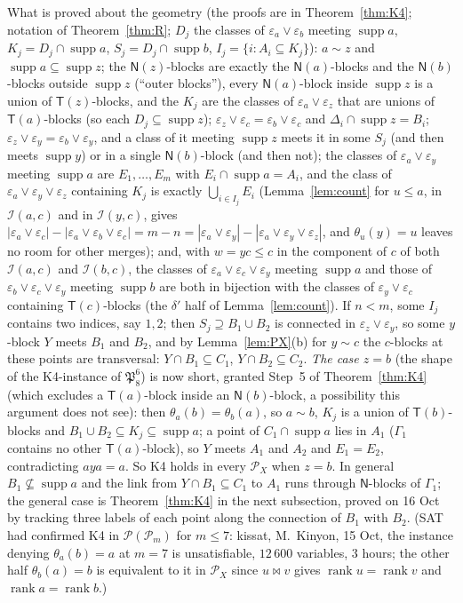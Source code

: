 \documentclass[11pt]{amsart}
\theoremstyle{definition}
\renewcommand{\P}{\mathcal{P}}
\newcommand{\supp}{\operatorname{supp}}
\newcommand{\T}{\mathsf{T}}
\newcommand{\N}{\mathsf{N}}
\newcommand{\rk}{\operatorname{rank}}
\newcommand{\mt}{\bowtie}   %
\begin{document}
What is proved about the geometry (the proofs are in Theorem~\ref{thm:K4}; notation of Theorem~\ref{thm:R}; $D_j$ the classes of $\varepsilon_a\vee\varepsilon_b$ meeting $\supp a$, $K_j=D_j\cap\supp a$, $S_j=D_j\cap\supp b$, $I_j=\{i:A_i\subseteq K_j\}$): $a\sim z$ and $\supp a\subseteq\supp z$; the $\N(z)$-blocks are exactly the $\N(a)$-blocks and the $\N(b)$-blocks outside $\supp z$ (``outer blocks''), every $\N(a)$-block inside $\supp z$ is a union of $\T(z)$-blocks, and the $K_j$ are the classes of $\varepsilon_a\vee\varepsilon_z$ that are unions of $\T(a)$-blocks (so each $D_j\subseteq\supp z$); $\varepsilon_z\vee\varepsilon_c=\varepsilon_b\vee\varepsilon_c$ and $\Delta_i\cap\supp z=B_i$; $\varepsilon_z\vee\varepsilon_y=\varepsilon_b\vee\varepsilon_y$, and a class of it meeting $\supp z$ meets it in some $S_j$ (and then meets $\supp y$) or in a single $\N(b)$-block (and then not); the classes of $\varepsilon_a\vee\varepsilon_y$ meeting $\supp a$ are $E_1,\dots,E_m$ with $E_i\cap\supp a=A_i$, and the class of $\varepsilon_a\vee\varepsilon_y\vee\varepsilon_z$ containing $K_j$ is exactly $\bigcup_{i\in I_j}E_i$ (Lemma~\ref{lem:count} for $u\le a$, in $\mathcal I(a,c)$ and in $\mathcal I(y,c)$, gives $|\varepsilon_a\vee\varepsilon_c|-|\varepsilon_a\vee\varepsilon_b\vee\varepsilon_c|=m-n=|\varepsilon_a\vee\varepsilon_y|-|\varepsilon_a\vee\varepsilon_y\vee\varepsilon_z|$, and $\theta_u(y)=u$ leaves no room for other merges); and, with $w=yc\le c$ in the component of $c$ of both $\mathcal I(a,c)$ and $\mathcal I(b,c)$, the classes of $\varepsilon_a\vee\varepsilon_c\vee\varepsilon_y$ meeting $\supp a$ and those of $\varepsilon_b\vee\varepsilon_c\vee\varepsilon_y$ meeting $\supp b$ are both in bijection with the classes of $\varepsilon_y\vee\varepsilon_c$ containing $\T(c)$-blocks (the $\delta'$ half of Lemma~\ref{lem:count}). If $n<m$, some $I_j$ contains two indices, say $1,2$; then $S_j\supseteq B_1\cup B_2$ is connected in $\varepsilon_z\vee\varepsilon_y$, so some $y$-block $Y$ meets $B_1$ and $B_2$, and by Lemma~\ref{lem:PX}(b) for $y\sim c$ the $c$-blocks at these points are transversal: $Y\cap B_1\subseteq C_1$, $Y\cap B_2\subseteq C_2$. \emph{The case $z=b$} (the shape of the K4-instance of $\mathfrak P_8^6$) is now short, granted Step~5 of Theorem~\ref{thm:K4} (which excludes a $\T(a)$-block inside an $\N(b)$-block, a possibility this argument does not see): then $\theta_a(b)=\theta_b(a)$, so $a\sim b$, $K_j$ is a union of $\T(b)$-blocks and $B_1\cup B_2\subseteq K_j\subseteq\supp a$; a point of $C_1\cap\supp a$ lies in $A_1$ ($\Gamma_1$ contains no other $\T(a)$-block), so $Y$ meets $A_1$ and $A_2$ and $E_1=E_2$, contradicting $aya=a$. So K4 holds in every $\P_X$ when $z=b$. In general $B_1\not\subseteq\supp a$ and the link from $Y\cap B_1\subseteq C_1$ to $A_1$ runs through $\N$-blocks of $\Gamma_1$; the general case is Theorem~\ref{thm:K4} in the next subsection, proved on 16 Oct by tracking three labels of each point along the connection of $B_1$ with $B_2$. (SAT had confirmed K4 in $\P(\P_m)$ for $m\le7$: kissat, M.~Kinyon, 15 Oct, the instance denying $\theta_a(b)=a$ at $m=7$ is unsatisfiable, $12\,600$ variables, $3$ hours; the other half $\theta_b(a)=b$ is equivalent to it in $\P_X$ since $u\mt v$ gives $\rk u=\rk v$ and $\rk a=\rk b$.)
\end{document}
